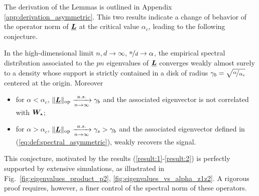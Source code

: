 The derivation of the Lemmas is outlined in Appendix \ref{app:derivation_asymmetric}.
This two results indicate a change of behavior of the operator norm of ${\underline{\bm{L}}}$ at the critical value $\alpha_c$, leading to the following conjecture. 
\begin{conjecture}
\label{conjecture:1}
     In the high-dimensional limit $n,d\to\infty$, $\nicefrac{n}{d}\to\alpha$, the empirical spectral distribution associated to the $pn$ eigenvalues of ${\underline{\bm{L}}}$ converges weakly almost surely to a density whose support is strictly contained in a disk of radius $\gamma_b = \sqrt{\nicefrac{\alpha}{\alpha_c}}$ centered at the origin. 
     Moreover
     \begin{itemize}
         \item  for $\alpha<\alpha_c$, $ \|{\underline{\bm{L}}} \|_{\mathrm{op}}  \xrightarrow[n \to \infty]{a.s.} \gamma_b$ and the associated eigenvector is not correlated with $\bm{W}_{\star}$;
         \item for $\alpha>\alpha_c$, $ \|{\underline{\bm{L}}} \|_{\mathrm{op}}  \xrightarrow[n \to \infty]{a.s.} \gamma_s > \gamma_b$ and the associated eigenvector defined in (\ref{eq:def:spectral_asymmetric}), weakly recovers the signal. 
     \end{itemize}
\end{conjecture}


This conjecture, motivated by the results (\ref{result:1}-\ref{result:2}) is perfectly supported by extensive simulations, as illustrated in Fig.~\ref{fig:eigenvalues_product_p2}, \ref{fig:eigenvalues_vs_alpha_z1z2}. A rigorous proof requires, however, a finer control of the spectral norm of these operators.

